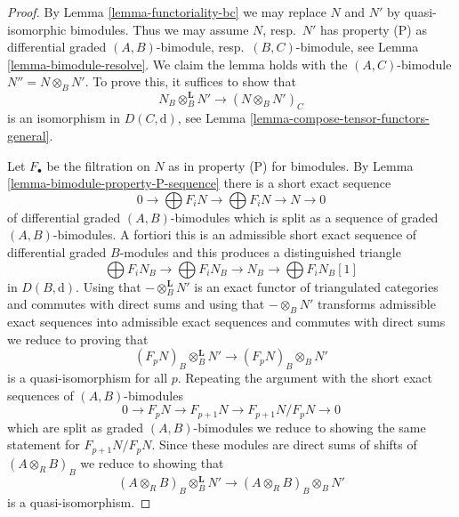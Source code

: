 \begin{proof}
By Lemma \ref{lemma-functoriality-bc} we may replace $N$ and $N'$ by
quasi-isomorphic bimodules. Thus we may assume $N$, resp.\ $N'$
has property (P) as differential graded
$(A, B)$-bimodule, resp.\ $(B, C)$-bimodule, see
Lemma \ref{lemma-bimodule-resolve}. We claim the lemma holds
with the $(A, C)$-bimodule $N'' = N \otimes_B N'$.
To prove this, it suffices to show that
$$
N_B \otimes_B^\mathbf{L} N' \longrightarrow (N \otimes_B N')_C
$$
is an isomorphism in $D(C, \text{d})$, see
Lemma \ref{lemma-compose-tensor-functors-general}.

\medskip\noindent
Let $F_\bullet$ be the filtration on $N$ as in property (P) for bimodules.
By Lemma \ref{lemma-bimodule-property-P-sequence}
there is a short exact sequence
$$
0 \to
\bigoplus\nolimits F_iN \to
\bigoplus\nolimits F_iN \to N \to 0
$$
of differential graded $(A, B)$-bimodules which is split as a sequence
of graded $(A, B)$-bimodules. A fortiori this is an admissible short exact
sequence of differential graded $B$-modules and this produces a distinguished
triangle
$$
\bigoplus\nolimits F_iN_B \to
\bigoplus\nolimits F_iN_B \to N_B \to
\bigoplus\nolimits F_iN_B[1]
$$
in $D(B, \text{d})$. Using that $- \otimes_B^\mathbf{L} N'$
is an exact functor of triangulated categories and commutes
with direct sums and using that $- \otimes_B N'$ transforms
admissible exact sequences into admissible exact sequences
and commutes with direct sums we reduce to proving
that
$$
(F_pN)_B \otimes_B^\mathbf{L} N' \longrightarrow (F_pN)_B \otimes_B N'
$$
is a quasi-isomorphism for all $p$. Repeating the argument
with the short exact sequences of $(A, B)$-bimodules
$$
0 \to F_pN \to F_{p + 1}N \to F_{p + 1}N/F_pN \to 0
$$
which are split as graded $(A, B)$-bimodules
we reduce to showing the same statement for $F_{p + 1}N/F_pN$.
Since these modules are direct sums of shifts of $(A \otimes_R B)_B$
we reduce to showing that
$$
(A \otimes_R B)_B \otimes_B^\mathbf{L} N'
\longrightarrow
(A \otimes_R B)_B \otimes_B N'
$$
is a quasi-isomorphism.


\end{proof}

